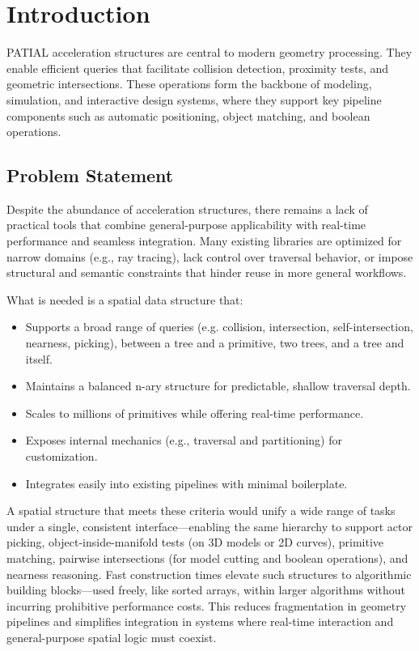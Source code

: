 \section{Introduction}

PATIAL acceleration structures are central to modern geometry processing.  
They enable efficient queries that facilitate collision detection,  
proximity tests, and geometric intersections. These operations form  
the backbone of modeling, simulation, and interactive design systems,  
where they support key pipeline components such as automatic positioning,  
object matching, and boolean operations.

\subsection{Problem Statement}

Despite the abundance of acceleration structures, there remains a lack of  
practical tools that combine general-purpose applicability with real-time  
performance and seamless integration. Many existing libraries are optimized  
for narrow domains (e.g., ray tracing), lack control over traversal behavior,  
or impose structural and semantic constraints that hinder reuse in more  
general workflows.

What is needed is a spatial data structure that:
\begin{itemize}
  \item Supports a broad range of queries (e.g. collision, intersection,
    self-intersection, nearness, picking),
  between a tree and a primitive, two trees, and a tree and itself.
  \item Maintains a balanced n-ary structure for predictable, shallow traversal depth.
  \item Scales to millions of primitives while offering real-time performance.
  \item Exposes internal mechanics (e.g., traversal and partitioning) for customization.
  \item Integrates easily into existing pipelines with minimal boilerplate.
\end{itemize}

A spatial structure that meets these criteria would unify a wide range of tasks  
under a single, consistent interface—enabling the same hierarchy to support  
actor picking, object-inside-manifold tests (on 3D models or 2D curves),  
primitive matching, pairwise intersections (for model cutting and boolean operations),  
and nearness reasoning. Fast construction times elevate such structures  
to algorithmic building blocks—used freely, like sorted arrays, within larger  
algorithms without incurring prohibitive performance costs. This reduces  
fragmentation in geometry pipelines and simplifies integration in systems  
where real-time interaction and general-purpose spatial logic must coexist.


